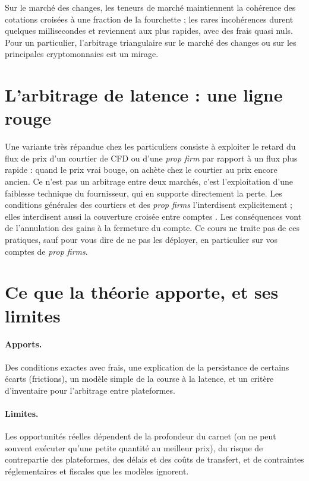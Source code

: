 Sur le marché des changes, les teneurs de marché maintiennent la cohérence des cotations croisées à une fraction de la fourchette ; les rares incohérences durent quelques millisecondes et reviennent aux plus rapides, avec des frais quasi nuls. Pour un particulier, l'arbitrage triangulaire sur le marché des changes ou sur les principales cryptomonnaies est un mirage.

\section{L'arbitrage de latence : une ligne rouge}

Une variante très répandue chez les particuliers consiste à exploiter le retard du flux de prix d'un courtier de CFD ou d'une \emph{prop firm} par rapport à un flux plus rapide : quand le prix \og vrai\fg{} bouge, on achète chez le courtier au prix encore ancien. Ce n'est pas un arbitrage entre deux marchés, c'est l'exploitation d'une faiblesse technique du fournisseur, qui en supporte directement la perte. Les conditions générales des courtiers et des \emph{prop firms} l'interdisent explicitement ; elles interdisent aussi la couverture croisée entre comptes \citep{nexusfi}. Les conséquences vont de l'annulation des gains à la fermeture du compte. Ce cours ne traite pas de ces pratiques, sauf pour vous dire de ne pas les déployer, en particulier sur vos comptes de \emph{prop firms}.

\section{Ce que la théorie apporte, et ses limites}

\paragraph{Apports.} Des conditions exactes avec frais, une explication de la persistance de certains écarts (frictions), un modèle simple de la course à la latence, et un critère d'inventaire pour l'arbitrage entre plateformes.

\paragraph{Limites.} Les opportunités réelles dépendent de la profondeur du carnet (on ne peut souvent exécuter qu'une petite quantité au meilleur prix), du risque de contrepartie des plateformes, des délais et des coûts de transfert, et de contraintes réglementaires et fiscales que les modèles ignorent.

